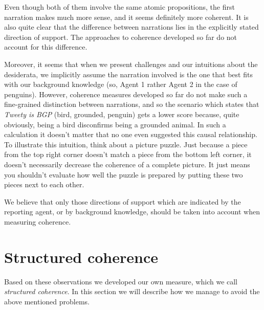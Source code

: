 \documentclass[10pt,]{scrartcl}
\begin{document}
\vspace{2mm}

\noindent Even though both of them involve the same atomic propositions,
the first narration makes much more sense, and it seems definitely more
coherent. It is also quite clear that the difference between narrations
lies in the explicitly stated direction of support. The approaches to
coherence developed so far do not account for this difference.

Moreover, it seems that when we present challenges and our intuitions
about the desiderata, we implicitly assume the narration involved is the
one that best fits with our background knowledge (so, Agent 1 rather
Agent 2 in the case of penguins). However, coherence measures developed
so far do not make such a fine-grained distinction between narrations,
and so the scenario which states that \textit{Tweety is BGP} (bird,
grounded, penguin) gets a lower score because, quite obviously, being a
bird disconfirms being a grounded animal. In such a calculation it
doesn't matter that no one even suggested this causal relationship. To
illustrate this intuition, think about a picture puzzle. Just because a
piece from the top right corner doesn't match a piece from the bottom
left corner, it doesn't necessarily decrease the coherence of a complete
picture. It just means you shouldn't evaluate how well the puzzle is
prepared by putting these two pieces next to each other.

We believe that only those directions of support which are indicated by
the reporting agent, or by background knowledge, should be taken into
account when measuring coherence.

\section{Structured coherence}

Based on these observations we developed our own measure, which we call
\textit{structured coherence}. In this section we will describe how we
manage to avoid the above mentioned problems.
\end{document}
